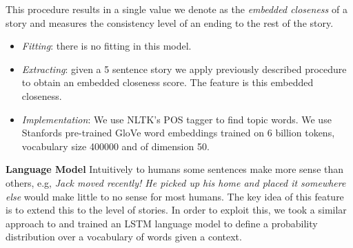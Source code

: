 \documentclass{article}
\begin{document}
This procedure results in a single value we denote as the \textit{embedded
    closeness} of a story and measures the consistency level of an ending to the
rest of the story.
%
\begin{itemize}
	\item \textit{Fitting}: there is no fitting in this model.
	\item \textit{Extracting}: given a 5 sentence story we apply previously described procedure to obtain an embedded closeness score. The feature is this embedded closeness.
	\item \textit{Implementation}: We use NLTK's POS tagger to find topic words. We use Stanfords pre-trained GloVe word embeddings trained on 6 billion tokens, vocabulary size 400000  and of dimension 50.
\end{itemize}
%
\textbf{Language Model} Intuitively to humans some sentences make more sense
than others, e.g, \textit{Jack moved recently! He picked up his home and placed
    it somewhere else} would make little to no sense for most humans. The key
idea of this feature is to extend this to the level of stories. In order to
exploit this, we took a similar approach to \cite{UWNLP} and trained an LSTM
language model to define a probability distribution over a vocabulary of words
given a context. 
\end{document}
